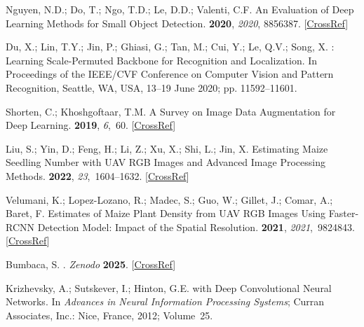 \documentclass[12pt,a4paper,oneside]{report}
\begin{document}
\begin{thebibliography}{999}
Nguyen, N.D.; Do, T.; Ngo, T.D.; Le, D.D.; Valenti, C.F.
\newblock An {{Evaluation}} of {{Deep Learning Methods}} for {{Small Object
Detection}}.
 {\bf 2020}, {\em 2020}, {8856387}. [\href{http://dx.doi.org/10.1155/2020/3189691}{CrossRef}]

Du, X.; Lin, T.Y.; Jin, P.; Ghiasi, G.; Tan, M.; Cui, Y.; Le, Q.V.; Song, X.
: {{Learning Scale-Permuted Backbone}} for
{{Recognition}} and {{Localization}}.
\newblock In Proceedings of the IEEE/CVF Conference on Computer Vision and Pattern Recognition, Seattle, WA, USA, 13--19 June 2020; pp. 11592--11601. 

Shorten, C.; Khoshgoftaar, T.M.
\newblock A Survey on {{Image Data Augmentation}} for {{Deep Learning}}.
 {\bf 2019}, {\em 6},~60. [\href{http://dx.doi.org/10.1186/s40537-019-0197-0}{CrossRef}]

Liu, S.; Yin, D.; Feng, H.; Li, Z.; Xu, X.; Shi, L.; Jin, X.
\newblock Estimating Maize Seedling Number with {{UAV RGB}} Images and Advanced
Image Processing Methods.
 {\bf 2022}, {\em 23},~1604--1632. [\href{http://dx.doi.org/10.1007/s11119-022-09899-y}{CrossRef}]

Velumani, K.; {Lopez-Lozano}, R.; Madec, S.; Guo, W.; Gillet, J.; Comar, A.;
Baret, F.
\newblock Estimates of {{Maize Plant Density}} from {{UAV RGB Images Using
Faster-RCNN Detection Model}}: {{Impact}} of the {{Spatial Resolution}}.
 {\bf 2021}, {\em 2021},~9824843. [\href{http://dx.doi.org/10.34133/2021/9824843}{CrossRef}]

Bumbaca, S.
. \emph{Zenodo} 
\textbf{2025}. [\href{http://dx.doi.org/10.5281/zenodo.15235602}{CrossRef}]

Krizhevsky, A.; Sutskever, I.; Hinton, G.E.
 with {{Deep Convolutional Neural
Networks}}.
\newblock In {\em Advances in Neural Information Processing
Systems}; Curran Associates, Inc.: Nice, France, 2012; Volume~25. 


\end{thebibliography}
\end{document}
